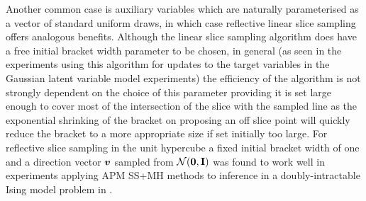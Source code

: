Another common case is auxiliary variables which are naturally parameterised as a vector of standard uniform draws, in which case reflective linear slice sampling offers analogous benefits. Although the linear slice sampling algorithm does have a free initial bracket width parameter to be chosen, in general (as seen in the experiments using this algorithm for updates to the target variables in the Gaussian latent variable model experiments) the efficiency of the algorithm is not strongly dependent on the choice of this parameter providing it is set large enough to cover most of the intersection of the slice with the sampled line as the exponential shrinking of the bracket on proposing an off slice point will quickly reduce the bracket to a more appropriate size if set initially too large. For reflective slice sampling in the unit hypercube a fixed initial bracket width of one and a direction vector $\boldsymbol{v}$ sampled from $\nrm{\vct{0},\mathbf{I}}$ was found to work well in experiments applying \ac{APM} \ac{SS}+\ac{MH} methods to inference in a doubly-intractable Ising model problem in \citep{murray2016pseudo}.

